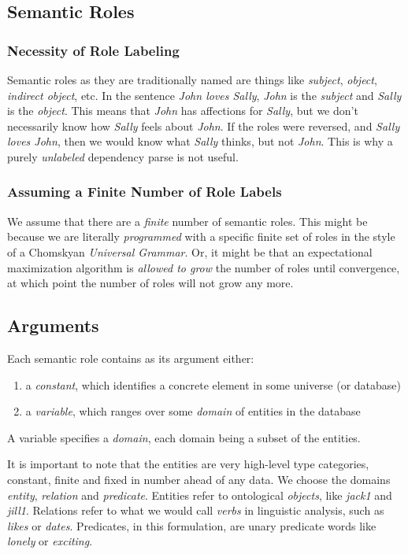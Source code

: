 \documentclass[12pt]{article}
\begin{document}
\subsection{Semantic Roles}
\subsubsection{Necessity of Role Labeling}
Semantic roles as they are traditionally named are things like {\em subject}, {\em object}, {\em indirect object}, etc.
In the sentence {\em John loves Sally}, {\em John} is the {\em subject} and {\em Sally} is the {\em object}.
This means that {\em John} has affections for {\em Sally}, but we don't necessarily know how {\em Sally} feels about {\em John}.
If the roles were reversed, and {\em Sally loves John}, then we would know what {\em Sally} thinks, but not {\em John}.
This is why a purely {\em unlabeled} dependency parse is not useful.

\subsubsection{Assuming a Finite Number of Role Labels}
We assume that there are a {\em finite} number of semantic roles.
This might be because we are literally {\em programmed} with a specific finite set of roles in the style of a Chomskyan {\em Universal Grammar}.
Or, it might be that an expectational maximization algorithm is {\em allowed to grow} the number of roles until convergence, at which point the number of roles will not grow any more.


\subsection{Arguments}
Each semantic role contains as its argument either:
\begin{enumerate}
    \item a \emph{constant}, which identifies a concrete element in some universe (or database)
    \item a \emph{variable}, which ranges over some \emph{domain} of entities in the database
\end{enumerate}

A variable specifies a \emph{domain}, each domain being a subset of the entities.

It is important to note that the entities are very high-level type categories, constant, finite and fixed in number ahead of any data.
We choose the domains \emph{entity}, \emph{relation} and \emph{predicate}.
Entities refer to ontological \emph{objects}, like \emph{jack1} and \emph{jill1}.
Relations refer to what we would call \emph{verbs} in linguistic analysis, such as \emph{likes} or \emph{dates}.
Predicates, in this formulation, are unary predicate words like \emph{lonely} or \emph{exciting}.
\end{document}
